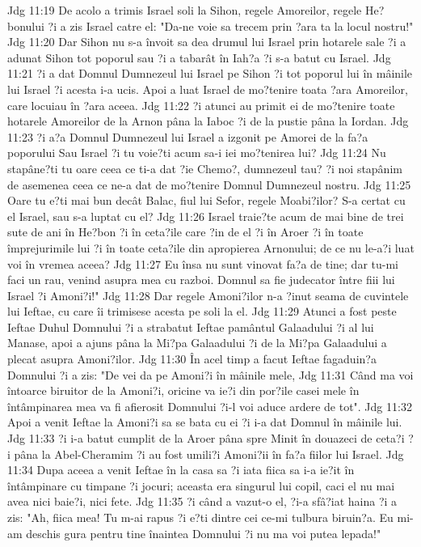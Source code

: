 Jdg 11:19  De acolo a trimis Israel soli la Sihon, regele Amoreilor, regele He?bonului ?i a zis Israel catre el: "Da-ne voie sa trecem prin ?ara ta la locul nostru!"
Jdg 11:20  Dar Sihon nu s-a învoit sa dea drumul lui Israel prin hotarele sale ?i a adunat Sihon tot poporul sau ?i a tabarât în Iah?a ?i s-a batut cu Israel.
Jdg 11:21  ?i a dat Domnul Dumnezeul lui Israel pe Sihon ?i tot poporul lui în mâinile lui Israel ?i acesta i-a ucis. Apoi a luat Israel de mo?tenire toata ?ara Amoreilor, care locuiau în ?ara aceea.
Jdg 11:22  ?i atunci au primit ei de mo?tenire toate hotarele Amoreilor de la Arnon pâna la Iaboc ?i de la pustie pâna la Iordan.
Jdg 11:23  ?i a?a Domnul Dumnezeul lui Israel a izgonit pe Amorei de la fa?a poporului Sau Israel ?i tu voie?ti acum sa-i iei mo?tenirea lui?
Jdg 11:24  Nu stapâne?ti tu oare ceea ce ti-a dat ?ie Chemo?, dumnezeul tau? ?i noi stapânim de asemenea ceea ce ne-a dat de mo?tenire Domnul Dumnezeul nostru.
Jdg 11:25  Oare tu e?ti mai bun decât Balac, fiul lui Sefor, regele Moabi?ilor? S-a certat cu el Israel, sau s-a luptat cu el?
Jdg 11:26  Israel traie?te acum de mai bine de trei sute de ani în He?bon ?i în ceta?ile care ?in de el ?i în Aroer ?i în toate împrejurimile lui ?i în toate ceta?ile din apropierea Arnonului; de ce nu le-a?i luat voi în vremea aceea?
Jdg 11:27  Eu însa nu sunt vinovat fa?a de tine; dar tu-mi faci un rau, venind asupra mea cu razboi. Domnul sa fie judecator între fiii lui Israel ?i Amoni?i!"
Jdg 11:28  Dar regele Amoni?ilor n-a ?inut seama de cuvintele lui Ieftae, cu care îi trimisese acesta pe soli la el.
Jdg 11:29  Atunci a fost peste Ieftae Duhul Domnului ?i a strabatut Ieftae pamântul Galaadului ?i al lui Manase, apoi a ajuns pâna la Mi?pa Galaadului ?i de la Mi?pa Galaadului a plecat asupra Amoni?ilor.
Jdg 11:30  În acel timp a facut Ieftae fagaduin?a Domnului ?i a zis: "De vei da pe Amoni?i în mâinile mele,
Jdg 11:31  Când ma voi întoarce biruitor de la Amoni?i, oricine va ie?i din por?ile casei mele în întâmpinarea mea va fi afierosit Domnului ?i-l voi aduce ardere de tot".
Jdg 11:32  Apoi a venit Ieftae la Amoni?i sa se bata cu ei ?i i-a dat Domnul în mâinile lui.
Jdg 11:33  ?i i-a batut cumplit de la Aroer pâna spre Minit în douazeci de ceta?i ?i pâna la Abel-Cheramim ?i au fost umili?i Amoni?ii în fa?a fiilor lui Israel.
Jdg 11:34  Dupa aceea a venit Ieftae în la casa sa ?i iata fiica sa i-a ie?it în întâmpinare cu timpane ?i jocuri; aceasta era singurul lui copil, caci el nu mai avea nici baie?i, nici fete.
Jdg 11:35  ?i când a vazut-o el, ?i-a sfâ?iat haina ?i a zis: "Ah, fiica mea! Tu m-ai rapus ?i e?ti dintre cei ce-mi tulbura biruin?a. Eu mi-am deschis gura pentru tine înaintea Domnului ?i nu ma voi putea lepada!"

